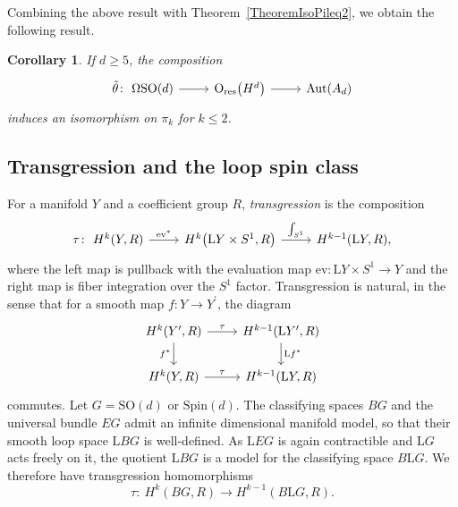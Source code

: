 \documentclass[pdftex]{sigma}
\numberwithin{equation}{section}
\newtheorem{Corollary}[Theorem]{Corollary}
\newcommand{\SO}{\mathrm{SO}}
\newcommand{\res}{\mathrm{res}}
\newcommand{\Aut}{\mathrm{Aut}}
\newcommand{\Spin}{\mathrm{Spin}}
\renewcommand{\O}{\mathrm{O}}
\renewcommand{\L}{\mathrm{L}}
\begin{document}
Combining the above result with Theorem~\ref{TheoremIsoPileq2}, we obtain the following result.

\begin{Corollary} \label{CorollaryDoubleIso}
 If $d \geq 5$, the composition
 \begin{equation*}%
 \begin{tikzcd}
 \tilde{\theta}\colon\ \Omega \SO(d) \ar[r] & \O_{\res}\big(H^d\big) \ar[r] & \Aut(A_d)
 \end{tikzcd}
 \end{equation*}
 induces an isomorphism on $\pi_k$ for $k \leq 2$.
\end{Corollary}



\subsection{Transgression and the loop spin class}
\label{SectionTransgression}

For a manifold $Y$ and a coefficient group $R$, \emph{transgression} is the composition
\begin{equation*}
\begin{tikzcd}
 \tau\colon\ H^k(Y, R) \ar[r, "\mathrm{ev}^*"] & H^k\big(\L Y \times S^1, R\big) \ar[r, "\int_{S^1}"] & H^{k-1}(\L Y, R),
\end{tikzcd}
\end{equation*}
where the left map is pullback with the evaluation map $\mathrm{ev}\colon \L Y \times S^1 \to Y$ and the right map is fiber integration over the $S^1$ factor.
Transgression is natural, in the sense that for a smooth map $f\colon Y \to Y^\prime$, the diagram
\begin{equation*}%
 \begin{tikzcd}
 H^k(Y^\prime, R) \ar[d, "f^*"'] \ar[r, "\tau"] & H^{k-1}(\L Y^\prime, R) \ar[d, "\L f^*"] \\
H^k(Y, R) \ar[r, "\tau"] & H^{k-1}(\L Y, R)
 \end{tikzcd}
\end{equation*}
commutes. Let $G = \SO(d)$ or $\Spin(d)$.
The classifying spaces $BG$ and the universal bundle $EG$ admit an infinite dimensional manifold model, so that their smooth loop space $\L BG$ is well-defined.
As $\L EG$ is again contractible and $\L G$ acts freely on it, the quotient $\L BG$ is a model for the classifying space $B \L G$.
We therefore have transgression homomorphisms
\begin{equation*}
 \tau\colon\ H^k(BG, R) \longrightarrow H^{k-1}(B\L G, R).
\end{equation*}
\end{document}

